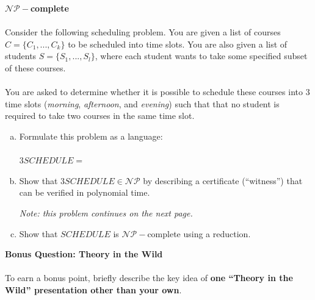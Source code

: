 \documentclass[12pt]{article}
\newenvironment{question}[2][Question]{\begin{trivlist}
\item[\hskip \labelsep {\bfseries #1}\hskip \labelsep {\bfseries #2.}]}{\end{trivlist}}
\begin{document}
\clearpage

\begin{question}{9}\textbf{$\mathcal{NP}-$complete}\\\\
Consider the following scheduling problem. You are given a list of courses $C = \{C_1,...,C_k\}$ to be scheduled into time slots. You are also given a list of students $S=\{S_1,...,S_l\}$, where each student wants to take some specified subset of these courses.\\\\
You are asked to determine whether it is possible to schedule these courses into 3 time slots (\textit{morning}, \textit{afternoon}, and \textit{evening}) such that that no student is required to take two courses in the same time slot.
\begin{enumerate}[(a)]
\item Formulate this problem as a language:\\\\
$3SCHEDULE =$
\vspace{10em}
\item Show that $3SCHEDULE \in \mathcal{NP}$ by describing a certificate (``witness'') that can be verified in polynomial time.\vfill{}\begin{center}\textit{Note: this problem continues on the next page.}\end{center}\clearpage
\item Show that $SCHEDULE$ is $\mathcal{NP}-$complete using a reduction.
\end{enumerate}
\end{question}
\clearpage

\textbf{Bonus Question: Theory in the Wild}\\\\
To earn a bonus point, briefly describe the key idea of \textbf{one ``Theory in the Wild'' presentation other than your own}.

 
\end{document}
